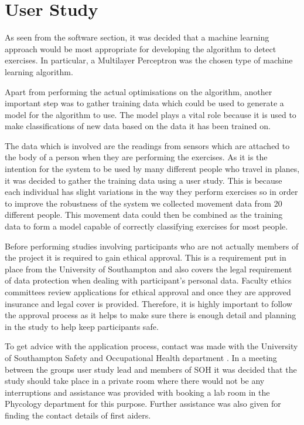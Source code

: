 \chapter{User Study}
As seen from the software section, it was decided that a machine learning approach would be most appropriate for developing the algorithm to detect exercises. In particular, a Multilayer Perceptron was the chosen type of machine learning algorithm. 

Apart from performing the actual optimisations on the algorithm, another important step was to gather training data which could be used to generate a model for the algorithm to use. The model plays a vital role because it is used to make classifications of new data based on the data it has been trained on.

The data which is involved are the readings from sensors which are attached to the body of a person when they are performing the exercises. As it is the intention for the system to be used by many different people who travel in planes, it was decided to gather the training data using a user study. This is because each individual has slight variations in the way they perform exercises so in order to improve the robustness of the system we collected movement data from 20 different people. This movement data could then be combined as the training data to form a model capable of correctly classifying exercises for most people.

Before performing studies involving participants who are not actually members of the project it is required to gain ethical approval. This is a requirement put in place from the University of Southampton and also covers the legal requirement of data protection when dealing with participant’s personal data. Faculty ethics committees review applications for ethical approval and once they are approved insurance and legal cover is provided. Therefore, it is highly important to follow the approval process as it helps to make sure there is enough detail and planning in the study to help keep participants safe.

To get advice with the application process, contact was made with the University of Southampton Safety and Occupational Health department \cite{sotonsoh}. In a meeting between the groups user study lead and members of SOH it was decided that the study should take place in a private room where there would not be any interruptions and assistance was provided with booking a lab room in the Phycology department for this purpose. Further assistance was also given for finding the contact details of first aiders.


